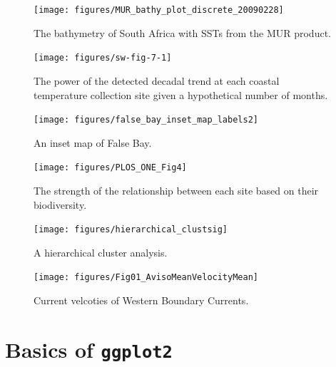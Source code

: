 \documentclass[
]{book}
\begin{document}
\begin{figure}

{\centering \texttt{[image: figures/MUR\_bathy\_plot\_discrete\_20090228]} 

}

\caption{The bathymetry of South Africa with SSTs from the MUR product.}\label{fig:example10}
\end{figure}

\begin{figure}

{\centering \texttt{[image: figures/sw-fig-7-1]} 

}

\caption{The power of the detected decadal trend at each coastal temperature collection site given a hypothetical number of months.}\label{fig:example13}
\end{figure}

\begin{figure}

{\centering \texttt{[image: figures/false\_bay\_inset\_map\_labels2]} 

}

\caption{An inset map of False Bay.}\label{fig:example5}
\end{figure}

\begin{figure}

{\centering \texttt{[image: figures/PLOS\_ONE\_Fig4]} 

}

\caption{The strength of the relationship between each site based on their biodiversity.}\label{fig:example19}
\end{figure}

\begin{figure}

{\centering \texttt{[image: figures/hierarchical\_clustsig]} 

}

\caption{A hierarchical cluster analysis.}\label{fig:example15}
\end{figure}

\begin{figure}

{\centering \texttt{[image: figures/Fig01\_AvisoMeanVelocityMean]} 

}

\caption{Current velcoties of Western Boundary Currents.}\label{fig:example17}
\end{figure}

\hypertarget{basics-of-ggplot2}{%
\section{\texorpdfstring{Basics of \textbf{\texttt{ggplot2}}}{Basics of ggplot2}}\label{basics-of-ggplot2}}
\end{document}
